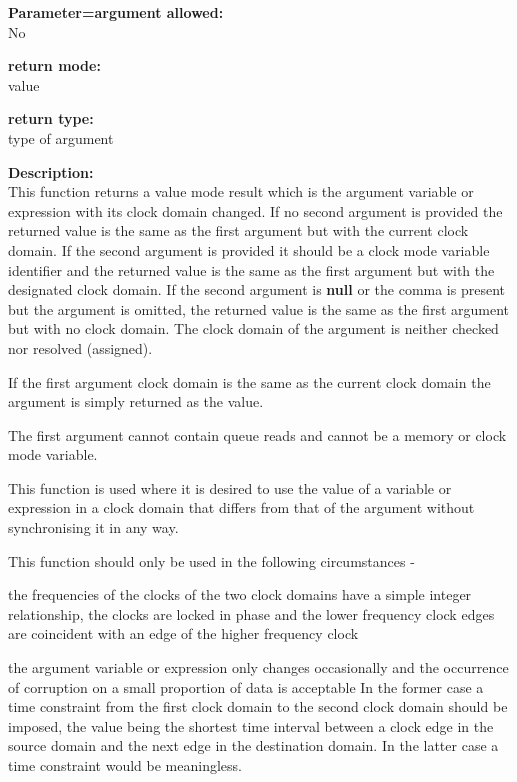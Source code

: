         {\bf Parameter=argument allowed:} \\
        No
        
        {\bf return mode:} \\
        value

        {\bf return type:} \\
        type of argument
        
        {\bf Description:} \\
        This function returns a value mode result which is the argument variable or
        expression with its clock domain changed. If no second argument is provided
        the returned value is the same as the first argument but with the current
        clock domain. If the second argument is provided it should be a clock mode
        variable identifier and the returned value is the same as the first
        argument but with the designated clock domain. If the second argument is
        {\bf null} or the comma is present but the argument is omitted, the
        returned value is the same as the first argument but with no clock domain.
        The clock domain of the argument is neither checked nor resolved
        (assigned).
        
        If the first argument clock domain is the same as the current clock domain
        the argument is simply returned as the value.        
        
        The first argument cannot contain queue reads and cannot be a memory or
        clock mode variable.
        
        This function is used where it is desired to use the value of a
        variable or expression in a clock domain that differs from that of the
        argument without synchronising it in any way.
        
        This function should only be used in the following circumstances -
        \blist
        \item   the frequencies of the clocks of the two clock domains have
                a simple integer relationship, the clocks are locked in phase
                and the lower frequency clock edges are coincident with
                an edge of the higher frequency clock
        \item   the argument variable or expression only changes occasionally
                and the occurrence of corruption on a small proportion
                of data is acceptable
        \blend
        In the former case a time constraint from the first clock domain to
        the second clock domain should be imposed, the value being the
        shortest time interval between a clock edge in the source domain and
        the next edge in the destination domain. In the latter case a time
        constraint would be meaningless.
        
